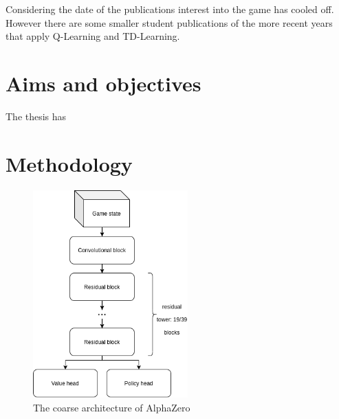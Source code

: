 \documentclass{../lib/llncs}
\begin{document}
Considering the date of the publications interest into the game has cooled off. However there are some smaller student publications of the more recent years that apply Q-Learning and TD-Learning. \cite{mizrachi_introduction_2017} \cite{lee_abalone_2005}

\section{Aims and objectives}
The thesis has

\section{Methodology}
\begin{figure}
    \centering
    \includegraphics[height=8cm, keepaspectratio]{alphazero_architecture_network.png}
    \caption{The coarse architecture of AlphaZero \cite{silver_mastering_2017}}
\end{figure}
\end{document}
